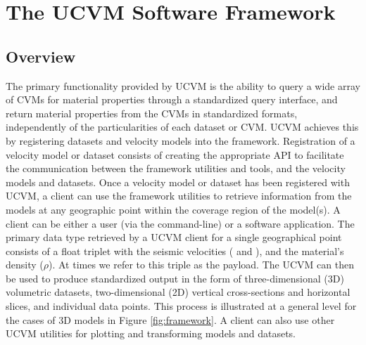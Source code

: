 






\section{The UCVM Software Framework}\label{sec:ucvm}

\subsection{Overview}

The primary functionality provided by UCVM is the ability to query a wide array of CVMs for material properties through a standardized query interface, and return material properties from the CVMs in standardized formats, independently of the particularities of each dataset or CVM. UCVM achieves this by registering datasets and velocity models into the framework. Registration of a velocity model or dataset consists of creating the appropriate API to facilitate the communication between the framework utilities and tools, and the velocity models and datasets. Once a velocity model or dataset has been registered with UCVM, a client can use the framework utilities to retrieve information from the models at any geographic point within the coverage region of the model(s). A client can be either a user (via the command-line) or a software application. The primary data type retrieved by a UCVM client for a single geographical point consists of a float triplet with the seismic velocities (\vp{} and \vs{}), and the material's density ($\rho$). At times we refer to this triple as the payload. The UCVM can then be used to produce standardized output in the form of three-dimensional (3D) volumetric datasets, two-dimensional (2D) vertical cross-sections and horizontal slices, and individual data points. This process is illustrated at a general level for the cases of 3D models in Figure \ref{fig:framework}. A client can also use other UCVM utilities for plotting and transforming models and datasets.

